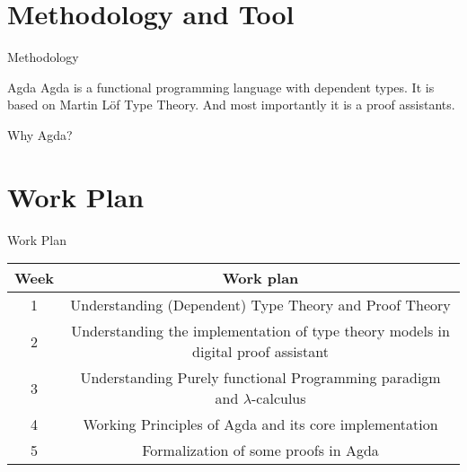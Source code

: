 \documentclass{beamer}
\begin{document}
\section{Methodology and Tool}
\begin{frame}{Methodology}
    
\end{frame}
\begin{frame}{Agda}
Agda is a functional programming language with dependent types. It is based on Martin Löf Type Theory. And most importantly it is a proof assistants.
\cite{inproceedings}
\end{frame}
\begin{frame}{Why Agda?}
\end{frame}

\section{Work Plan}
\begin{frame}{Work Plan}
  \begin{center}
    \begin{tabular}{|c|c|}
        \hline
        Week & Work plan \\
        \hline
         1 & Understanding (Dependent) Type Theory and Proof Theory\\
        \hline
         2 & Understanding the implementation of type theory models in digital proof assistant \\
        \hline
         3 & Understanding Purely functional Programming paradigm and $ \lambda $-calculus\\
        \hline
         4 & Working Principles of Agda and its core implementation \\
        \hline 
         5 & Formalization of some proofs in Agda \\
        \hline


    \end{tabular}
\end{center}
\end{frame}
\end{document}
